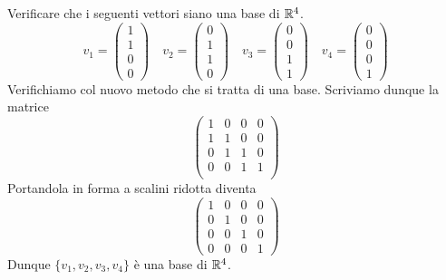 \begin{example}
	Verificare che i seguenti vettori siano una base di $\mathbb{R}^4$.
	\[
		v_1 = \begin{pmatrix}
			1 \\ 1 \\ 0 \\ 0
		\end{pmatrix} \quad
		v_2 = \begin{pmatrix}
			0 \\ 1 \\ 1 \\ 0
		\end{pmatrix} \quad
		v_3 = \begin{pmatrix}
			0 \\ 0 \\ 1 \\ 1
		\end{pmatrix} \quad
		v_4 = \begin{pmatrix}
			0 \\ 0 \\ 0 \\ 1
		\end{pmatrix}
	\]
	Verifichiamo col nuovo metodo che si tratta di una base.
	Scriviamo dunque la matrice
	\[
		\begin{pmatrix}
			1 & 0 & 0 & 0 \\
			1 & 1 & 0 & 0 \\
			0 & 1 & 1 & 0 \\
			0 & 0 & 1 & 1 \\
		\end{pmatrix}
	\]
	Portandola in forma a scalini ridotta diventa
	\[
		\begin{pmatrix}
			1 & 0 & 0 & 0 \\
			0 & 1 & 0 & 0 \\
			0 & 0 & 1 & 0 \\
			0 & 0 & 0 & 1
		\end{pmatrix}
	\]
	Dunque $\{v_1, v_2, v_3, v_4\}$ è una base di $\mathbb{R}^4$.
\end{example}

